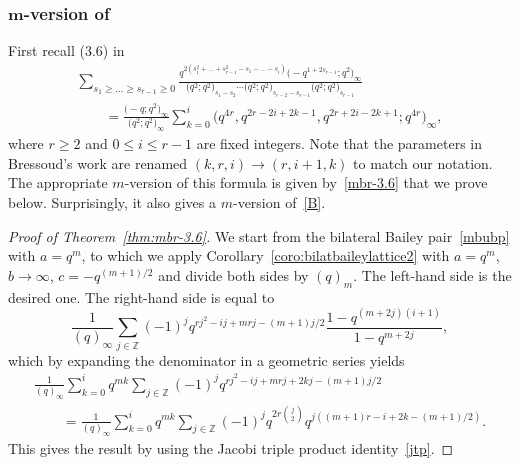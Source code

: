 \documentclass[pdftex]{sigma}
\numberwithin{equation}{section}
\begin{document}
\subsubsection[m-version of Ref. 13, equation (3.6)]{$\boldsymbol{m}$-version of \cite[equation (3.6)]{Br80}}
First recall (3.6) in~\cite{Br80}
\begin{gather}
\sum_{s_1\geq\dots\geq s_{r-1}\geq0}\frac{q^{2(s_1^2+\dots+s_{r-1}^2-s_{1}-\dots-s_{i})}\bigl(-q^{1+2s_{r-1}};q^2\bigr)_\infty}{\bigl(q^2;q^2\bigr)_{s_1-s_2}\cdots
\bigl(q^2;q^2\bigr)_{s_{r-2}-s_{r-1}}\bigl(q^2;q^2\bigr)_{s_{r-1}}}\nonumber\\
\qquad=\frac{\bigl(-q;q^2\bigr)_\infty}{\bigl(q^2;q^2\bigr)_\infty}\sum_{k=0}^{i}\bigl(q^{4r},q^{2r-2i+2k-1},q^{2r+2i-2k+1};q^{4r}\bigr)_\infty,\label{B3.6}
\end{gather}
where $r\geq 2$ and $0\leq i\leq r-1$ are fixed integers. Note that the parameters in Bressoud's work are renamed $(k,r,i)\to(r,i+1,k)$ to match our notation. The appropriate $m$-version of this formula is given by~\eqref{mbr-3.6} that we prove below. Surprisingly, it also gives a $m$-version of~\eqref{B}.

\begin{proof}[Proof of Theorem~\ref{thm:mbr-3.6}]
We start from the bilateral Bailey pair~\eqref{mbubp} with $a=q^m$, to which we apply Corollary~\ref{coro:bilatbaileylattice2} with $a=q^m$, $b\to\infty$, $c=-q^{(m+1)/2}$ and divide both sides by $(q)_m$. The left-hand side is the desired one. The right-hand side is equal to
\begin{equation*}
\frac{1}{(q)_\infty}\sum_{j\in\mathbb{Z}}(-1)^jq^{rj^2-ij+mrj-(m+1)j/2}\frac{1-q^{(m+2j)(i+1)}}{1-q^{m+2j}},
\end{equation*}
which by expanding the denominator in a geometric series yields
\begin{gather*}
\frac{1}{(q)_\infty}\sum_{k=0}^iq^{mk}\sum_{j\in\mathbb{Z}}(-1)^{j}q^{rj^2-ij+mrj+2kj-(m+1)j/2}\\
\qquad=\frac{1}{(q)_\infty}\sum_{k=0}^iq^{mk}\sum_{j\in\mathbb{Z}}(-1)^{j}q^{2r\binom{j}{2}}q^{j((m+1)r-i+2k-(m+1)/2)}.
\end{gather*}
This gives the result by using the Jacobi triple product identity~\eqref{jtp}.
\end{proof}
\end{document}
